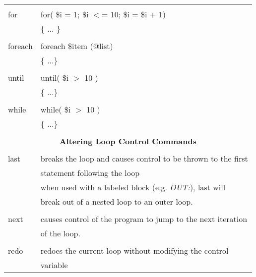 \documentclass[10pt]{article}
\begin{document}
\begin{textblock*}{90.68mm}
\begin{tabular*}{90.68mm}{l @{\extracolsep{\fill}} l}
        & \\
for     & for( \$i = 1; \$i $<$= 10; \$i = \$i + 1)\\
        & \{ ... \}\\
	    & \\
foreach & foreach \$item (@list)\\
        & \{ ...\}\\
		& \\
until   & until( \$i $>$ 10 ) \\
        & \{ ...\}\\
		& \\
while   & while( \$i $>$ 10 ) \\
        & \{ ...\}\\
		& \\
\multicolumn{2}{c}{\bf Altering Loop Control Commands} \\
        & \\
last    & breaks the loop and causes control to be thrown to the first \\
        & statement following the loop\\
		& when used with a labeled block (e.g. \emph{OUT:}), last will\\
		& break out of a nested loop to an outer loop.\\
		& \\
next    & causes control of the program to jump to the next iteration\\
        & of the loop.\\
		& \\
redo    & redoes the current loop without modifying the control\\
        & variable\\
\end{tabular*}
\end{textblock*}
\end{document}
